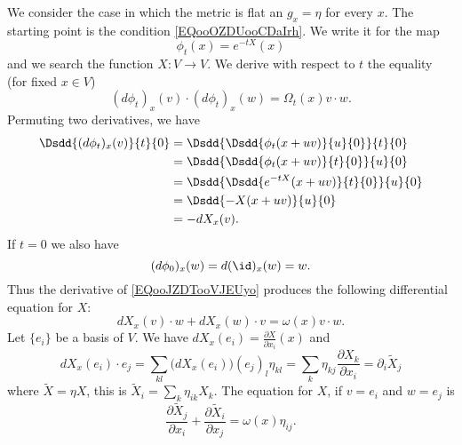 We consider the case in which the metric is flat an \( g_x=\eta\) for every \( x\).  The starting point is the condition \eqref{EQooOZDUooCDaIrh}. We write it for the map
\begin{equation}
    \phi_t(x)= e^{-tX}(x)
\end{equation}
and we search the function \( X\colon V\to V\). We derive with respect to \( t\) the equality (for fixed \( x\in V\))
\begin{equation}        \label{EQooJZDTooVJEUyo}
    (d\phi_t)_x(v)\cdot (d\phi_t)_x(w)=\Omega_t(x)v\cdot w.
\end{equation}
Permuting two derivatives, we have
\begin{subequations}
    \begin{align}
        \Dsdd{ (d\phi_t)_x(v) }{t}{0}&=\Dsdd{ \Dsdd{   \phi_t(x+uv)  }{u}{0} }{t}{0}\\
        &=\Dsdd{\Dsdd{ \phi_t(x+uv) }{t}{0} }{u}{0}\\
        &=\Dsdd{ \Dsdd{  e^{-tX}(x+uv) }{t}{0} }{u}{0}\\
        &=\Dsdd{ -X(x+uv) }{u}{0}\\
        &=-dX_x(v).
    \end{align}
\end{subequations}
If \( t=0\) we also have
\begin{equation}
    (d\phi_0)_x(w)=d(\id)_x(w)=w.
\end{equation}
Thus the derivative of \eqref{EQooJZDTooVJEUyo} produces the following differential equation for \( X\):
\begin{equation}
    dX_x(v)\cdot w+dX_x(w)\cdot v=\omega(x)v\cdot w.
\end{equation}
Let \( \{ e_i \}\) be a basis of \( V\). We have \( dX_x(e_i)=\frac{ \partial X }{ \partial x_i }(x)\) and
\begin{equation}
    dX_x(e_i)\cdot e_j=\sum_{kl}\big( dX_x(e_i) \big)(e_j)_l\eta_{kl}=\sum_k\eta_{kj}\frac{ \partial X_k }{ \partial x_i }=\partial_i\tilde X_j
\end{equation}
where \( \tilde X=\eta X\), this is \( \tilde X_i=\sum_k\eta_{ik}X_k\). The equation for \( X\), if \( v=e_i\) and \( w=e_j\) is
\begin{equation}        \label{EQooAKZWooOVIdur}
    \frac{ \partial \tilde X_j }{ \partial x_i }+\frac{ \partial \tilde X_i }{ \partial x_j }=\omega(x)\eta_{ij}.
\end{equation}

